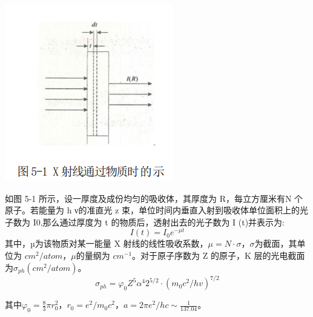 \documentclass[hyperref]{ctexart}
\begin{document}
	\begin{center}\includegraphics[scale=0.6]{t51}\end{center}
	如图 5-1 所示，设一厚度及成份均匀的吸收体，其厚度为 R，每立方厘米有N 个原子。若能量为 h ν的准直光 z 束，单位时间内垂直入射到吸收体单位面积上的光子数为 I0,那么通过厚度为 t 的物质后，透射出去的光子数为 I (t)并表示为:
	\begin{equation}
	I(t)=I_0e^{- \mu t}\label{11}
	\end{equation}
	其中，µ为该物质对某一能量 X 射线的线性吸收系数，$\mu = N \cdot \sigma $，$\sigma$为截面，其单位为 $cm^{2}/atom$，$\mu$的量纲为 $cm^{-1}$。对于原子序数为 Z 的原子，K 层的光电截面为$\sigma_{ph}(cm^{2}/atom)$。
	\begin{equation}
	\sigma_{ph}=\varphi_0 Z^5 \alpha^4 2^{5/2} \cdot (m_0c^2/hv)^{7/2}\label{sikao}
	\end{equation}

	其中$\varphi_0 = \frac{8}{3}\pi r_0^2$，$r_0 = e^2/m_0c^2$，$a = 2\pi e^2/hc \sim \frac{1}{137.04}$。
\end{document}
